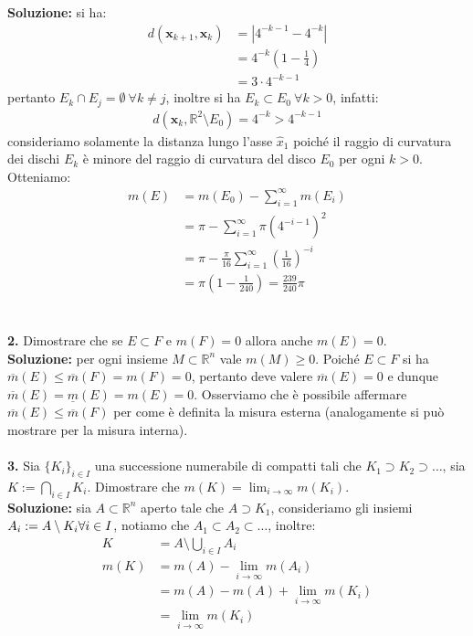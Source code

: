 \documentclass{article}
\numberwithin{equation}{subsection}
\begin{document}
\textbf{Soluzione:} si ha:
\begin{align*}
    d(\mathbf{x}_{k + 1}, \mathbf{x}_k) &= | 4^{-k - 1} - 4^{-k} |  \\
    &= 4^{-k}(1 - \frac{1}{4})  \\
    &= 3 \cdot 4^{-k - 1} 
\end{align*}
pertanto $E_k \cap E_j = \emptyset \ \forall k \neq j$, inoltre si ha $E_k \subset E_0 \ \forall k > 0$, infatti:
\begin{align*}
    d(\mathbf{x}_k, \mathbb{R}^2 \setminus E_0) = 4^{-k} > 4^{-k - 1} 
\end{align*}
consideriamo solamente la distanza lungo l'asse $\hat{x}_1$ poiché il raggio di curvatura dei dischi $E_k$ è minore del raggio di curvatura del disco $E_0$ per ogni $k > 0$. Otteniamo:
\begin{align*}
    m(E) &= m(E_0) - \sum_{i = 1}^\infty m(E_i)  \\
    &= \pi - \sum_{i = 1}^\infty \pi (4^{-i - 1})^2  \\
    &= \pi - \frac{\pi}{16}\sum_{i = 1}^\infty \left( \frac{1}{16} \right)^{-i}  \\
    &= \pi \left(1 - \frac{1}{240} \right) = \frac{239}{240}\pi 
\end{align*}
\\ \\
\textbf{2.} Dimostrare che se $E \subset F$ e $m(F) = 0$ allora anche $m(E) = 0$. \\

\textbf{Soluzione:} per ogni insieme $M \subset \mathbb{R}^n$ vale $m(M) \geq 0$. Poiché $E \subset F$ si ha $\overline{m}(E) \leq \overline{m}(F) = m(F) = 0$, pertanto deve valere $\overline{m}(E) = 0$ e dunque $\overline{m}(E) = \underline{m}(E) = m(E) = 0$. Osserviamo che è possibile affermare $\overline{m}(E) \leq \overline{m}(F)$ per come è definita la misura esterna (analogamente si può mostrare per la misura interna). \\ \\
\textbf{3.} Sia $\{ K_i \}_{i \in I}$ una successione numerabile di compatti tali che $K_1 \supset K_2 \supset \dots$, sia $K := \bigcap_{i \in I} K_i$. Dimostrare che $m(K) = \lim_{i \rightarrow \infty} m(K_i)$. \\

\textbf{Soluzione:} sia $A \subset \mathbb{R}^n$ aperto tale che $A \supset K_1$, consideriamo gli insiemi $A_i := A \setminus K_i \\ \forall i \in I$, notiamo che $A_1 \subset A_2 \subset \dots$, inoltre:
\begin{align*}
    K &= A \setminus \bigcup_{i \in I} A_i  \\
    m(K) &= m(A) - \lim_{i \rightarrow \infty} m(A_i)  \\
    &= m(A) - m(A) + \lim_{i \rightarrow \infty} m(K_i)  \\
    &= \lim_{i \rightarrow \infty} m(K_i) 
\end{align*} \newpage
\end{document}
